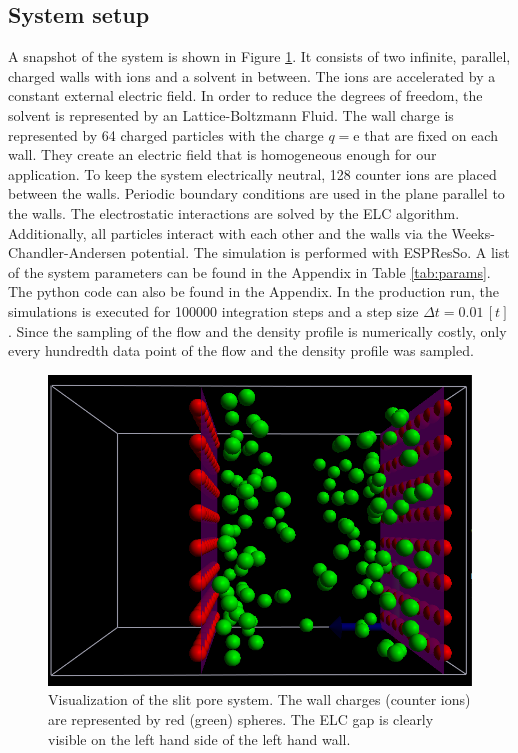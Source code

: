 \subsection{System setup}
A snapshot of the system is shown in Figure \ref{fig:system1}. It consists of two infinite, parallel, charged walls with ions and a solvent in between. The ions are accelerated by a constant external electric field.  In order to reduce the degrees of freedom, the solvent is represented by an Lattice-Boltzmann Fluid. The wall charge is represented by 64 charged particles with the charge $q=\text{e}$ that are fixed on each wall. They create an electric field that is homogeneous enough for our application. To keep the system electrically neutral, 128 counter ions are placed between the walls. Periodic boundary conditions are used in the plane  parallel to the walls.  The electrostatic interactions are solved by the ELC algorithm. Additionally, all particles interact with each other and the walls via the Weeks-Chandler-Andersen potential. The simulation is performed with ESPResSo. A list of the system parameters can be found in the Appendix in Table \ref{tab:params}.
The python code can also be found in the Appendix. In the production run, the simulations is executed for 100000 integration steps and a step size $\Delta t= 0.01\,[t]$. Since the sampling of the flow and the density profile is numerically costly, only  every hundredth data point of the flow and the density profile was sampled.
\begin{figure}[H]
	\centering
	\includegraphics[width=\columnwidth]{Analysis_2/system}
	\captionsetup{width=\columnwidth}
	\caption{Visualization of the slit pore system. The wall charges (counter ions) are represented by red (green) spheres. The ELC gap is clearly visible on the left hand side of the left hand wall.}
	\label{fig:system1}
\end{figure}
